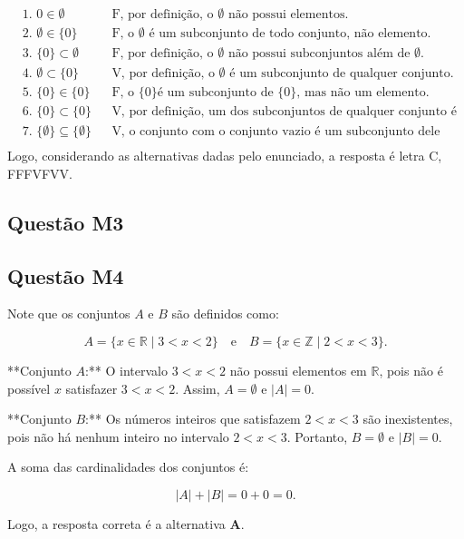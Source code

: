 \documentclass{article}
\begin{document}
\[
\begin{aligned}
& \text{1. } 0 \in \emptyset &&\text{F, por definição, o $\emptyset$ não possui elementos.} \\
& \text{2. } \emptyset \in \{0\} &&\text{F, o $\emptyset$ é um subconjunto de todo conjunto, não elemento.}\\
& \text{3. } \{0\} \subset \emptyset &&\text{F, por definição, o $\emptyset$ não possui subconjuntos além de $\emptyset$.} \\
& \text{4. } \emptyset \subset \{0\} &&\text{V, por definição, o $\emptyset$ é um subconjunto de qualquer conjunto.} \\
& \text{5. } \{0\} \in \{0\} &&\text{F, o \{0\} é um subconjunto de \{0\}, mas não um elemento.} \\
& \text{6. } \{0\} \subset \{0\} &&\text{V, por definição, um dos subconjuntos de qualquer conjunto é ele mesmo.} \\
& \text{7. } \{\emptyset\} \subseteq \{\emptyset\} &&\text{V, o conjunto com o conjunto vazio é um subconjunto dele mesmo.} \\
\end{aligned}
\]
Logo, considerando as alternativas dadas pelo enunciado, a resposta é letra C, FFFVFVV.

\subsection{Questão M3}
\subsection{Questão M4}
Note que os conjuntos \( A \) e \( B \) são definidos como:

\[
A = \{x \in \mathbb{R} \mid 3 < x < 2\} \quad \text{e} \quad B = \{x \in \mathbb{Z} \mid 2 < x < 3\}.
\]

**Conjunto \( A \):** O intervalo \( 3 < x < 2 \) não possui elementos em \(\mathbb{R}\), pois não é possível \( x \) satisfazer \( 3 < x < 2 \). Assim, \( A = \emptyset \) e \(|A| = 0\).

**Conjunto \( B \):** Os números inteiros que satisfazem \( 2 < x < 3 \) são inexistentes, pois não há nenhum inteiro no intervalo \( 2 < x < 3 \). Portanto, \( B = \emptyset \) e \(|B| = 0\).

A soma das cardinalidades dos conjuntos é:

\[
|A| + |B| = 0 + 0 = 0.
\]

Logo, a resposta correta é a alternativa \(\mathbf{A}\).
\end{document}
